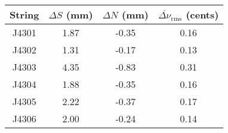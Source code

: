 \begin{tabular}{cccc}
\toprule
String &  $\Delta S$ (mm) &  $\Delta N$ (mm) &  $\overline{\Delta \nu}_\text{rms}$ (cents) \\
\midrule
 J4301 &             1.87 &            -0.35 &                                        0.16 \\
 J4302 &             1.31 &            -0.17 &                                        0.13 \\
 J4303 &             4.35 &            -0.83 &                                        0.31 \\
 J4304 &             1.88 &            -0.35 &                                        0.16 \\
 J4305 &             2.22 &            -0.37 &                                        0.17 \\
 J4306 &             2.00 &            -0.24 &                                        0.14 \\
\bottomrule
\end{tabular}

